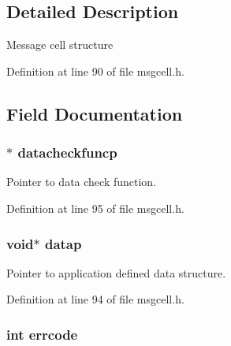 \subsection{Detailed Description}
Message cell structure 

Definition at line 90 of file msgcell.\-h.



\subsection{Field Documentation}
\hypertarget{struct___m_s_g_c_e_l_l_a6ba9472f22524db3bf5a3fc593b8ae23}{
\subsubsection[{datacheckfuncp}]{$\ast$ datacheckfuncp}}\label{struct___m_s_g_c_e_l_l_a6ba9472f22524db3bf5a3fc593b8ae23}


Pointer to data check function. 



Definition at line 95 of file msgcell.\-h.

\hypertarget{struct___m_s_g_c_e_l_l_aeb5cadc7793d3e5ed0c725dbb3c04491}{
\subsubsection[{datap}]{\setlength{\rightskip}{0pt plus 5cm}void$\ast$ datap}}\label{struct___m_s_g_c_e_l_l_aeb5cadc7793d3e5ed0c725dbb3c04491}


Pointer to application defined data structure. 



Definition at line 94 of file msgcell.\-h.

\hypertarget{struct___m_s_g_c_e_l_l_a213ff6a6c12188e0b1f181decf95f6f4}{
\subsubsection[{errcode}]{\setlength{\rightskip}{0pt plus 5cm}int errcode}}\label{struct___m_s_g_c_e_l_l_a213ff6a6c12188e0b1f181decf95f6f4}


